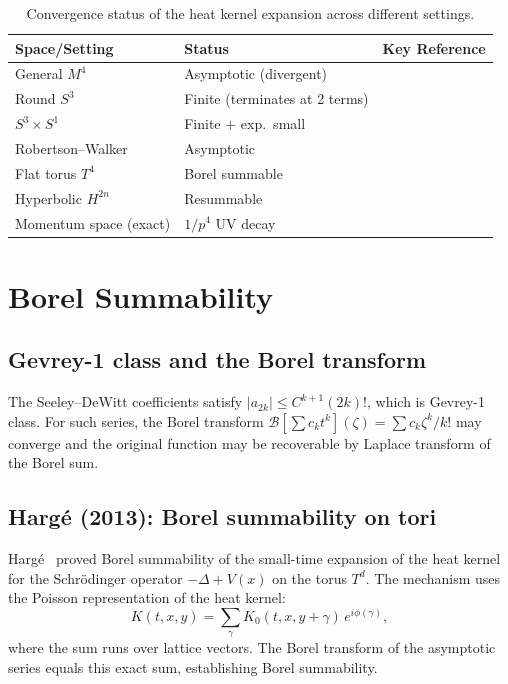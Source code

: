 \documentclass[11pt,a4paper]{article}
\begin{document}
\begin{table}[h]
\centering
\begin{tabular}{lll}
\toprule
Space/Setting & Status & Key Reference \\
\midrule
General $M^4$ & Asymptotic (divergent) & \cite{V03,A00,BGV04,G95} \\
Round $S^3$ & Finite (terminates at 2 terms) & \cite{CC08} \\
$S^3 \times S^1$ & Finite $+$ exp.\ small & \cite{CC08} \\
Robertson--Walker & Asymptotic & \cite{CC11} \\
Flat torus $T^4$ & Borel summable & \cite{H13a,H13b} \\
Hyperbolic $H^{2n}$ & Resummable & \cite{D21} \\
Momentum space (exact) & $1/p^4$ UV decay & \cite{ILV11} \\
\bottomrule
\end{tabular}
\caption{Convergence status of the heat kernel expansion across
different settings.}
\label{tab:convergence-summary}
\end{table}


\section{Borel Summability}\label{sec:borel}

\subsection{Gevrey-1 class and the Borel transform}

The Seeley--DeWitt coefficients satisfy $|a_{2k}| \leq C^{k+1}(2k)!$,
which is Gevrey-1 class.  For such series, the Borel transform
$\mathcal{B}[\sum c_k t^k](\zeta) = \sum c_k \zeta^k / k!$ may converge
and the original function may be recoverable by Laplace transform of
the Borel sum.

\subsection{Harg\'{e} (2013): Borel summability on tori}

Harg\'{e}~\cite{H13a} proved Borel summability of the small-time
expansion of the heat kernel for the Schr\"{o}dinger operator
$-\Delta + V(x)$ on the torus $T^d$.  The mechanism uses the Poisson
representation of the heat kernel:
\begin{equation}
  K(t,x,y) = \sum_\gamma K_0(t,x,y+\gamma)\,e^{i\phi(\gamma)},
\end{equation}
where the sum runs over lattice vectors.  The Borel transform of the
asymptotic series equals this exact sum, establishing Borel summability.
\end{document}
